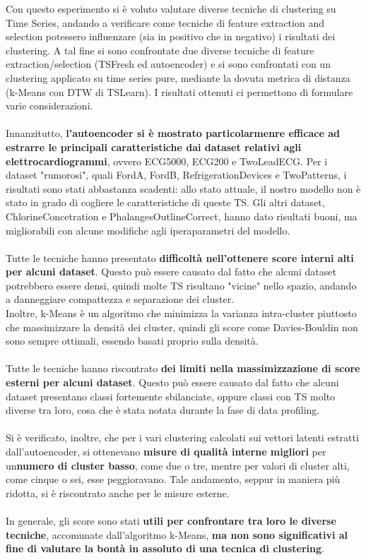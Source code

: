 Con questo esperimento si è voluto valutare diverse tecniche di clustering su Time Series, andando a verificare come tecniche di feature extraction and selection potessero influenzare (sia in positivo che in negativo) i risultati dei clustering.
A tal fine si sono confrontate due diverse tecniche di feature extraction/selection (TSFresh ed autoencoder) e si sono confrontati con un clustering applicato su time series pure, mediante la dovuta metrica di distanza (k-Means con DTW di TSLearn).
I risultati ottenuti ci permettono di formulare varie considerazioni.\\ 
\\
Innanzitutto, \textbf{l'autoencoder si è mostrato particolarmenre efficace ad estrarre le principali caratteristiche dai dataset relativi agli elettrocardiogrammi}, ovvero ECG5000, ECG200 e TwoLeadECG.
Per i dataset "rumorosi", quali FordA, FordB, RefrigerationDevices e TwoPatterns, i risultati sono stati abbastanza scadenti: allo stato attuale, il nostro modello non è stato in grado di cogliere le caratteristiche di queste TS.
Gli altri dataset, ChlorineConcetration e PhalangesOutlineCorrect, hanno dato risultati buoni, ma migliorabili con alcune modifiche agli iperaparametri del modello.\\
\\
Tutte le tecniche hanno presentato \textbf{difficoltà nell'ottenere score interni alti per alcuni dataset}. Questo può essere causato dal fatto che alcuni dataset potrebbero essere densi, quindi molte TS risultano "vicine" nello spazio, andando a danneggiare compattezza e separazione dei cluster.\\
Inoltre, k-Means è un algoritmo che minimizza la varianza intra-cluster piuttosto che massimizzare la densità dei cluster, quindi gli score come Davies-Bouldin non sono sempre ottimali, essendo basati proprio sulla densità.\\
\\
Tutte le tecniche hanno riscontrato \textbf{dei limiti nella massimizzazione di score esterni per alcuni dataset}. Questo può essere causato dal fatto che alcuni dataset presentano classi fortemente sbilanciate, oppure classi con TS molto diverse tra loro, cosa che è stata notata durante la fase di data profiling.\\
\\
Si è verificato, inoltre, che per i vari clustering calcolati sui vettori latenti estratti dall'autoencoder, si ottenevano \textbf{misure di qualità interne migliori} per un\textbf{numero di cluster basso}, come due o tre, mentre per valori di cluster alti, come cinque o sei, esse peggioravano.
Tale andamento, seppur in maniera più ridotta, si è riscontrato anche per le misure esterne.\\
\\ 
In generale, gli score sono stati \textbf{utili per confrontare tra loro le diverse tecniche}, accomunate dall'algoritmo k-Means, \textbf{ma non sono significativi al fine di valutare la bontà in assoluto di una tecnica di clustering}.